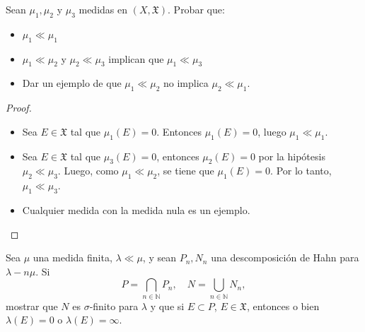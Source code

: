 \documentclass[12pt]{article}
\newenvironment{statement}[2][Ejercicio]{\begin{trivlist}
\item[\hskip \labelsep {\bfseries #1}\hskip \labelsep {\bfseries #2.}]}{\end{trivlist}}
\begin{document}
\begin{statement}{4}
    Sean $\mu_1, \mu_2$ y $\mu_3$ medidas en $(X, \mathfrak{X})$. Probar que:
    \begin{itemize}
        \item[(a)] $\mu_1 \ll \mu_1$
        \item[(b)] $\mu_1 \ll \mu_2$ y $\mu_2 \ll \mu_3$ implican que $\mu_1 \ll \mu_3$
        \item[(c)] Dar un ejemplo de que $\mu_1 \ll \mu_2$ no implica $\mu_2 \ll \mu_1$.
    \end{itemize}

\end{statement}

\begin{proof}
    \begin{itemize}
        \item[(a)] Sea $E \in \mathfrak{X}$ tal que $\mu_1(E) = 0$. Entonces $\mu_1(E) = 0$, luego $\mu_1 \ll \mu_1$.
        \item[(b)] Sea $E \in \mathfrak{X}$ tal que $\mu_3(E) = 0$, entonces $\mu_2(E) = 0$ por la hipótesis $\mu_2 \ll \mu_3$. Luego, como $\mu_1 \ll \mu_2$, se tiene que $\mu_1(E) = 0$. Por lo tanto, $\mu_1 \ll \mu_3$.
        \item[(c)] Cualquier medida con la medida nula es un ejemplo.
    \end{itemize}
\end{proof}

\begin{statement}{5}
    Sea $\mu$ una medida finita, $\lambda \ll \mu$, y sean $P_n, N_n$ una descomposición de Hahn para $\lambda - n\mu$. Si
    \[
        P = \bigcap_{n \in \mathbb{N}} P_n, \quad N = \bigcup_{n \in \mathbb{N}} N_n,
    \]
    mostrar que $N$ es $\sigma$-finito para $\lambda$ y que si $E \subset P$, $E \in \mathfrak{X}$, entonces o bien $\lambda(E) = 0$ o $\lambda(E) = \infty$.
\end{statement}
\end{document}
